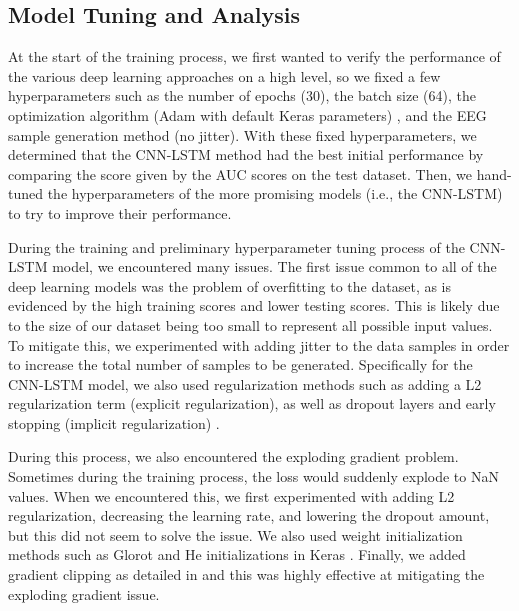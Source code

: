 \documentclass[format=sigconf, nonacm=true, review=false, screen=true]{acmart}
\begin{document}
\subsection{Model Tuning and Analysis} \label{sec:modeltraining}
At the start of the training process, we first wanted to verify the performance of the various deep learning approaches on a high level, so we fixed a few hyperparameters such as the number of epochs (30), the batch size (64), the optimization algorithm (Adam with default Keras parameters) \cite{adamoptimizer, chollet2015keras}, and the EEG sample generation method (no jitter). With these fixed hyperparameters, we determined that the CNN-LSTM method had the best initial performance by comparing the score given by the AUC scores on the test dataset. Then, we hand-tuned the hyperparameters of the more promising models (i.e., the CNN-LSTM) to try to improve their performance.

During the training and preliminary hyperparameter tuning process of the CNN-LSTM model, we encountered many issues. The first issue common to all of the deep learning models was the problem of overfitting to the dataset, as is evidenced by the high training scores and lower testing scores. This is likely due to the size of our dataset being too small to represent all possible input values. To mitigate this, we experimented with adding jitter to the data samples in order to increase the total number of samples to be generated. Specifically for the CNN-LSTM model, we also used regularization methods such as adding a L2 regularization term (explicit regularization), as well as dropout layers and early stopping (implicit regularization) \cite{srivastava14a}.

During this process, we also encountered the exploding gradient problem. Sometimes during the training process, the loss would suddenly explode to NaN values. When we encountered this, we first experimented with adding L2 regularization, decreasing the learning rate, and lowering the dropout amount, but this did not seem to solve the issue.
We also used weight initialization methods such as Glorot and He initializations in Keras \cite{Glorot2010UnderstandingTD, HeZR015}.
Finally, we added gradient clipping as detailed in \cite{pascanu2012} and this was highly effective at mitigating the exploding gradient issue.

\end{document}
